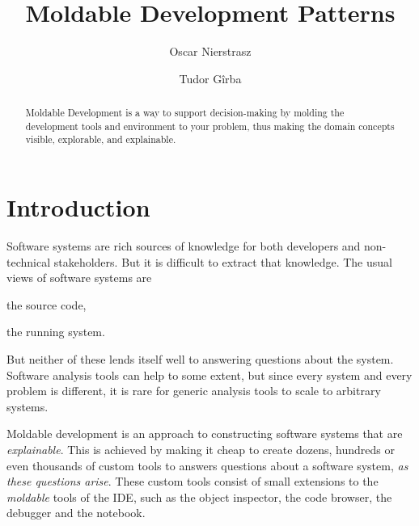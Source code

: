 \documentclass[sigconf]{acmart}
\newcommand{\nb}[2]{\nbc{#1}{#2}{orange}}
\newcommand\todo[1]{\nb{TO DO}{#1}}
\begin{document}
\title{Moldable Development Patterns}

\author{Oscar Nierstrasz}

\author{Tudor G\^irba}

\renewcommand{\shortauthors}{G\^irba et al.}

\begin{abstract}
\todo{Rewrite.}
Moldable Development is a way to support decision-making by molding the development tools and environment to your problem, thus making the domain concepts visible, explorable, and explainable.
\end{abstract}



\maketitle

\section{Introduction}

Software systems are rich sources of knowledge for both developers and non-technical stakeholders.
But it is difficult to extract that knowledge.
The usual views of software systems are
\begin{inparaenum}[(i)]
\item the source code,
\item the running system.
\end{inparaenum}
But neither of these lends itself well to answering questions about the system.
Software analysis tools can help to some extent, but since every system and every problem is different, it is rare for generic analysis tools to scale to arbitrary systems.

Moldable development is an approach to constructing software systems that are \emph{explainable}.
This is achieved by making it cheap to create dozens, hundreds or even thousands of custom tools to answers questions about a software system, \emph{as these questions arise}.
These custom tools consist of small extensions to the \emph{moldable} tools of the IDE, such as the object inspector, the code browser, the debugger and the notebook.
\end{document}
